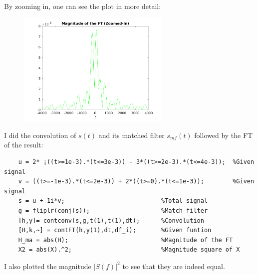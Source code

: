 \documentclass[a4paper,11pt]{article}
\begin{document}
By zooming in, one can see the plot in more detail:

\begin{figure}[!hp]
    \begin{center}
      \includegraphics[width=0.65\textwidth]{images/exercice_5a_c.png}
    \end{center}
\end{figure}

\newpage

I did the convolution of $s(t)$ and its matched filter $s_{mf}(t)$ followed by the FT of the result:

\bigskip

\begin{lstlisting}
    u = 2* ¡((t>=1e-3).*(t<=3e-3)) - 3*((t>=2e-3).*(t<=4e-3));	%Given signal
    v = ((t>=-1e-3).*(t<=2e-3)) + 2*((t>=0).*(t<=1e-3));        %Given signal
    s = u + 1i*v;                           %Total signal
    g = fliplr(conj(s));                    %Match filter
    [h,y]= contconv(s,g,t(1),t(1),dt);      %Convolution
    [H,k,~] = contFT(h,y(1),dt,df_i);       %Given funtion
    H_ma = abs(H);                          %Magnitude of the FT
    X2 = abs(X).^2;                         %Magnitude square of X
\end{lstlisting}

\bigskip

I also plotted the magnitude $|S(f)|^2$ to see that they are indeed equal.
\end{document}
